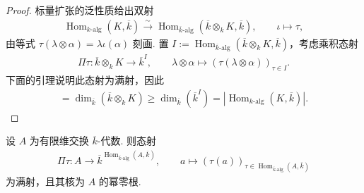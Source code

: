 \begin{proof}
标量扩张的泛性质给出双射
\begin{align*}
\operatorname{Hom}_{k\text{-alg}}(K,\overline k)\xrightarrow{\sim}\operatorname{Hom}_{\overline k\text{-alg}}(\overline k\otimes_k K,\overline k),\qquad\iota\longmapsto\tau,
\end{align*}
由等式 $\tau(\lambda\otimes\alpha)=\lambda\iota(\alpha)$ 刻画. 置 $I:=\operatorname{Hom}_{\overline k\text{-alg}}(\overline k\otimes_k K,\overline k)$，考虑乘积态射
\begin{align*}
\Pi\tau:\overline k\otimes_k K\longrightarrow\overline k^I,\qquad\lambda\otimes\alpha\longmapsto(\tau(\lambda\otimes\alpha))_{\tau\in I}.
\end{align*}
下面的引理说明此态射为满射，因此
\begin{align*}
[K:k]=\dim_{\overline k}(\overline k\otimes_k K)\geqslant\dim_{\overline k}(\overline k^I)=|\operatorname{Hom}_{k\text{-alg}}(K,\overline k)|.
\end{align*}
\end{proof}
\begin{lemma*}
设 $A$ 为有限维交换 $\overline k$-代数. 则态射
\begin{align*}
\Pi\tau:A\longrightarrow\overline k^{\operatorname{Hom}_{\overline k\text{-alg}}(A,\overline k)},\qquad a\longmapsto(\tau(a))_{\tau\in\operatorname{Hom}_{\overline k\text{-alg}}(A,\overline k)}
\end{align*}
为满射，且其核为 $A$ 的幂零根.
\end{lemma*}
